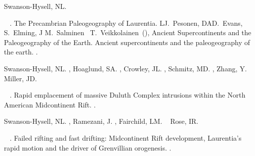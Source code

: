 \documentclass[draft]{agujournal2019}
\begin{document}
\begin{thebibliography}{}
%
\begin{APACrefauthors}%
Swanson-Hysell, N\BPBI L.%
\end{APACrefauthors}%
\unskip\
\newblock
{}.
\newblock
{\BBOQ} {{The
  Precambrian Paleogeography of Laurentia}}.{\BBCQ}
\newblock
\BIn{} L\BPBI J.~Pesonen, D\BPBI A\BPBI D.~Evans, S\BPBI {\AA}.~Elming, J\BPBI
  M.~Salminen\BCBL {}\ \BBA {} T.~Veikkolainen\ (\BEDS), \APACrefbtitle
  {Ancient Supercontinents and the Paleogeography of the Earth.} {Ancient
  supercontinents and the paleogeography of the earth.}
\newblock
{}.
\PrintBackRefs{\CurrentBib}

%
\begin{APACrefauthors}%
Swanson-Hysell, N\BPBI L.%
, Hoaglund, S\BPBI A.%
, Crowley, J\BPBI L.%
, Schmitz, M\BPBI D.%
, Zhang, Y.%
\BCBL {}\ \BBA {} Miller, J\BPBI D.%
\end{APACrefauthors}%
\unskip\
\newblock
{}.
\newblock
{\BBOQ} {{Rapid emplacement of massive
  Duluth Complex intrusions within the North American Midcontinent
  Rift}}.{\BBCQ}
\newblock
{}.
\newblock
\begin{APACrefDOI}  \end{APACrefDOI}
\PrintBackRefs{\CurrentBib}

%
\begin{APACrefauthors}%
Swanson-Hysell, N\BPBI L.%
, Ramezani, J.%
, Fairchild, L\BPBI M.%
\BCBL {}\ \BBA {} Rose, I\BPBI R.%
\end{APACrefauthors}%
\unskip\
\newblock
{}.
\newblock
{\BBOQ} {{Failed rifting and fast drifting: Midcontinent Rift
  development, Laurentia's rapid motion and the driver of Grenvillian
  orogenesis}}.{\BBCQ}
\newblock
\APACjournalVolNumPages{GSA Bulletin}{131}{}{913--940}.
\newblock
\begin{APACrefDOI}  \end{APACrefDOI}
\PrintBackRefs{\CurrentBib}


\end{thebibliography}
\end{document}
